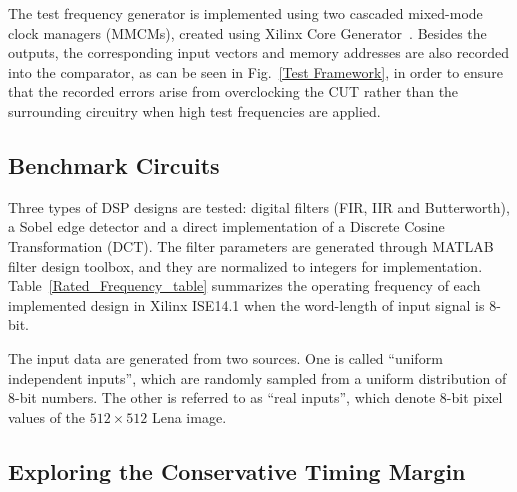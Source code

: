 \documentclass[prodmode,acmtrets]{acmsmall} %
\begin{document}
The test frequency generator is implemented using two cascaded mixed-mode clock managers (MMCMs), created using Xilinx Core Generator~\cite{Virtex6Clocking}. Besides the outputs, the corresponding input vectors and memory addresses are also recorded into the comparator, as can be seen in Fig.~\ref{Test Framework}, in order to ensure that the recorded errors arise from overclocking the CUT rather than the surrounding circuitry when high test frequencies are applied.

\subsection{Benchmark Circuits}
Three types of DSP designs are tested: digital filters (FIR, IIR and Butterworth), a Sobel edge detector and a direct implementation of a Discrete Cosine Transformation (DCT). The filter parameters are generated through MATLAB filter design toolbox, and they are normalized to integers for implementation. Table~\ref{Rated_Frequency_table} summarizes the operating frequency of each implemented design in Xilinx ISE14.1 when the word-length of input signal is 8-bit.

\begin{table}%
\end{table}%

The input data are generated from two sources. One is called ``uniform independent inputs'', which are randomly sampled from a uniform distribution of 8-bit numbers. The other is referred to as ``real inputs'', which denote 8-bit pixel values of the $512\! \times\! 512$ Lena image.

\subsection{Exploring the Conservative Timing Margin} %
\label{sub:exploring_the_conservative_timing_margin}
\end{document}
